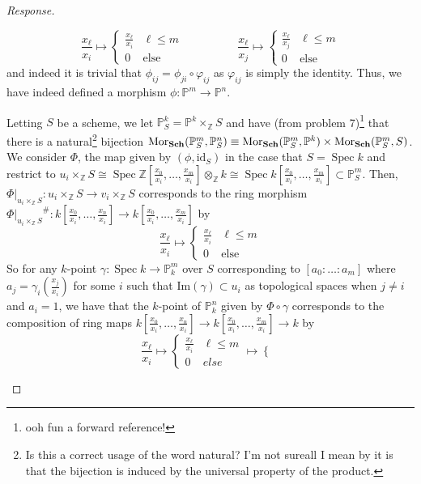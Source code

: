 \documentclass[english,letter,doublesided]{article}
\newcommand{\evat}[3]{\left. #1\right|_{#2}^{#3}}
\DeclareMathOperator{\spec}{Spec}
\newcommand{\mor}{\mathrm{Mor}}
\newcommand{\ZZ}{\mathbb{Z}}
\newcommand{\PP}{\mathbb{P}}
\theoremstyle{remark}
\theoremstyle{definition}
\newcommand{\id}{\mathrm{id} }
\newcommand{\im}{\mathrm{Im}}
\newcommand{\cat}[1]{{\mathrm{\bf{#1}}}}
\newcommand{\restr}[2]{{\evat{#1}{#2}{}}}
\newcommand{\gph}{\varphi}
\newcommand{\fv}[2]{\frac{x_{#1}}{x_{#2}}}
\begin{document}
\begin{proof}[Response]
\begin{enumerate}[label=\textit{(\roman*)}]
\begin{equation*}
\fv{\ell}{i}\mapsto \begin{cases}
\fv{\ell}{i}&\ell\leq m\\0&\text{else}
\end{cases}\hspace{2cm}\fv{\ell}{j}\mapsto \begin{cases}
\fv{\ell}{j}&\ell\leq m\\0&\text{else}
\end{cases}
	\end{equation*}
	and indeed it is trivial that $\phi_{ij}=\phi_{ji}\circ \gph_{ij}$ as $\gph_{ij}$ is simply the identity. Thus, we have indeed defined a morphism $\phi:\PP^m\to \PP^n$. 
	
Letting $S$ be a scheme, we let $\PP^k_S=\PP^k\times_{\ZZ}S$ and have (from problem 7)\footnote{ooh fun a forward reference!} that there is a natural\footnote{Is this a correct usage of the word natural? I'm not sure\textemdash all I mean by it is that the bijection is induced by the universal property of the product.} bijection $\mor_\cat{Sch}(\PP^m_S,\PP^n_S)\equiv \mor_\cat{Sch}(\PP^m_S,\PP^k)\times \mor_\cat{Sch}(\PP^m_S,S)$. We consider $\Phi$, the map given by $(\phi,\id_S)$ in the case that $S=\spec k$ and restrict to $u_i\times_\ZZ S\cong \spec \ZZ[\fv{0}{i},\hdots,\fv{m}{i}]\otimes_\ZZ k\cong \spec k[\fv{0}{i},\hdots,\fv{m}{i}]\subset \PP^m_S$. 
Then, $\restr{\Phi}{{u_i\times_\ZZ S}}:u_i\times_\ZZ S\to v_i\times_\ZZ S$ 
corresponds to the ring morphism $ \restr{\Phi}{{u_{i} {\times}_{\ZZ} S}}^\#:k[\fv{0}{i},\hdots,\fv{n}{i}]\to k[\fv{0}{i},\hdots,\fv{m}{i}]$ by  \begin{equation*}
\fv{\ell}{i}\mapsto \begin{cases}
\fv{\ell}{i}&\ell\leq m\\0&\text{else}
\end{cases}\end{equation*}
So for any $k$-point $\gamma:\spec k\to \PP^m_k$ over $S$ corresponding to $[a_0:\hdots:a_m]$ where $a_j=\gamma_i(\fv{j}{i})$ for some $i$ such that $\im(\gamma)\subset u_i$ as topological spaces when $j\neq i$ and $a_i=1$, we have that the $k$-point of $\PP^n_k$ given by $\Phi\circ \gamma$ corresponds to the composition of ring maps $k[\fv{0}{i},\hdots,\fv{n}{i}]\to k[\fv{0}{i},\hdots,\fv{m}{i}]\to k$ by 
\begin{equation*}
	\fv{\ell}{i}\mapsto \begin{cases}
	\fv{\ell}{i}&\ell\leq m\\
	0&else
	\end{cases}\mapsto  \begin{cases}

\end{cases}
\end{equation*}
\end{enumerate}
\end{proof}
\end{document}
